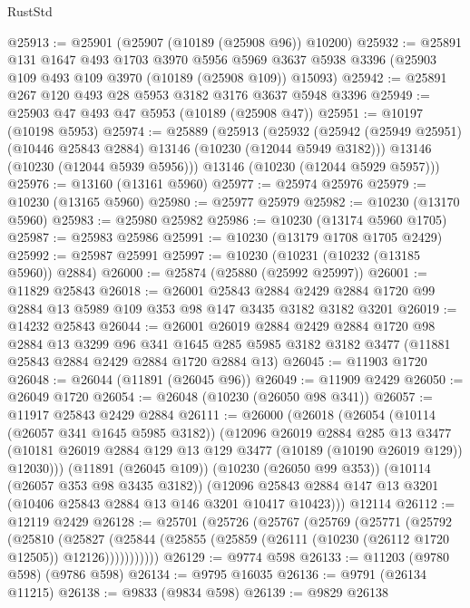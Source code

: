 \begin{lexlean}{RustStd}
\begin{coremodule}
@25913 := @25901 (@25907 (@10189 (@25908 @96)) @10200)
@25932 := @25891
    @131
    @1647
    @493
    @1703
    @3970
    @5956
    @5969
    @3637
    @5938
    @3396
    (@25903 @109 @493 @109 @3970 (@10189 (@25908 @109)) @15093)
@25942 := @25891 @267 @120 @493 @28 @5953 @3182 @3176 @3637 @5948 @3396
@25949 := @25903 @47 @493 @47 @5953 (@10189 (@25908 @47))
@25951 := @10197 (@10198 @5953)
@25974 := @25889
    (@25913
      (@25932
        (@25942 (@25949 @25951) (@10446 @25843 @2884) @13146 (@10230 (@12044 @5949 @3182)))
        @13146
        (@10230 (@12044 @5939 @5956)))
      @13146
      (@10230 (@12044 @5929 @5957)))
@25976 := @13160 (@13161 @5960)
@25977 := @25974 @25976
@25979 := @10230 (@13165 @5960)
@25980 := @25977 @25979
@25982 := @10230 (@13170 @5960)
@25983 := @25980 @25982
@25986 := @10230 (@13174 @5960 @1705)
@25987 := @25983 @25986
@25991 := @10230 (@13179 @1708 @1705 @2429)
@25992 := @25987 @25991
@25997 := @10230 (@10231 (@10232 (@13185 @5960)) @2884)
@26000 := @25874 (@25880 (@25992 @25997))
@26001 := @11829 @25843
@26018 := @26001
    @25843
    @2884
    @2429
    @2884
    @1720
    @99
    @2884
    @13
    @5989
    @109
    @353
    @98
    @147
    @3435
    @3182
    @3182
    @3201
@26019 := @14232 @25843
@26044 := @26001
    @26019
    @2884
    @2429
    @2884
    @1720
    @98
    @2884
    @13
    @3299
    @96
    @341
    @1645
    @285
    @5985
    @3182
    @3182
    @3477
    (@11881 @25843 @2884 @2429 @2884 @1720 @2884 @13)
@26045 := @11903 @1720
@26048 := @26044 (@11891 (@26045 @96))
@26049 := @11909 @2429
@26050 := @26049 @1720
@26054 := @26048 (@10230 (@26050 @98 @341))
@26057 := @11917 @25843 @2429 @2884
@26111 := @26000
    (@26018
      (@26054
        (@10114 (@26057 @341 @1645 @5985 @3182))
        (@12096
          @26019
          @2884
          @285
          @13
          @3477
          (@10181 @26019 @2884 @129 @13 @129 @3477 (@10189 (@10190 @26019 @129)) @12030)))
      (@11891 (@26045 @109))
      (@10230 (@26050 @99 @353))
      (@10114 (@26057 @353 @98 @3435 @3182))
      (@12096 @25843 @2884 @147 @13 @3201 (@10406 @25843 @2884 @13 @146 @3201 @10417 @10423)))
    @12114
@26112 := @12119 @2429
@26128 := @25701
    (@25726
      (@25767
        (@25769
          (@25771
            (@25792
              (@25810
                (@25827
                  (@25844 (@25855 (@25859 (@26111 (@10230 (@26112 @1720 @12505)) @12126)))))))))))
@26129 := @9774 @598
@26133 := @11203 (@9780 @598) (@9786 @598)
@26134 := @9795 @16035
@26136 := @9791 (@26134 @11215)
@26138 := @9833 (@9834 @598)
@26139 := @9829 @26138

\end{coremodule}
\end{lexlean}
